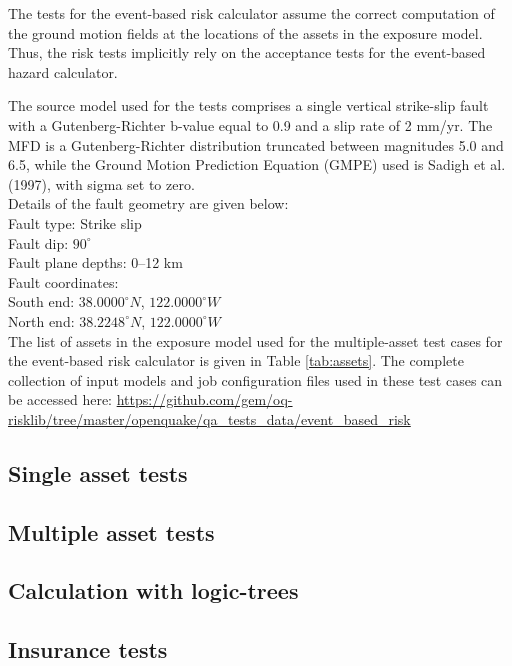 The tests for the event-based risk calculator assume the correct computation of the ground motion fields at the locations of the assets in the exposure model. Thus, the risk tests implicitly rely on the acceptance tests for the event-based hazard calculator.

The source model used for the tests comprises a single vertical strike-slip fault with a Gutenberg-Richter b-value equal to 0.9 and a slip rate of 2 mm/yr. The MFD is a Gutenberg-Richter distribution truncated between magnitudes 5.0 and 6.5, while the Ground Motion Prediction Equation (GMPE) used is Sadigh et al. (1997), with sigma set to zero.\\

\noindent Details of the fault geometry are given below:\\

\noindent
Fault type: Strike slip\\
Fault dip: $90^{\circ}$\\
Fault plane depths: 0--12 km\\
Fault coordinates:\\
South end: $38.0000^{\circ} N$, $122.0000^{\circ} W$\\
North end: $38.2248^{\circ} N$, $122.0000^{\circ} W$\\



The list of assets in the exposure model used for the multiple-asset test cases for the event-based risk calculator is given in Table \ref{tab:assets}. The complete collection of input models and job configuration files used in these test cases can be accessed here:
\href{https://github.com/gem/oq-risklib/tree/master/openquake/qa_tests_data/event_based_risk}
{https://github.com/gem/oq-risklib/tree/master/openquake/qa\_tests\_data/event\_based\_risk}

\subsection{Single asset tests}
\label{subsec:acc-ebr-single}


\subsection{Multiple asset tests}
\label{subsec:acc-ebr-multiple}


\subsection{Calculation with logic-trees}
\label{subsec:acc-ebr-logictrees}


\subsection{Insurance tests}
\label{subsec:acc-ebr-insurance}

